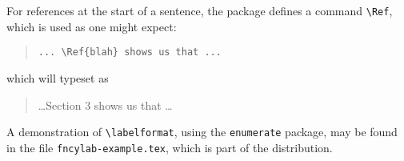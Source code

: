 \documentclass[a4paper]{article}
\newcommand\Package[1]{\texttt{#1}}
\newcommand\cs[1]{\texttt{\textbackslash#1}}
\begin{document}
For references at the start of a sentence, the package defines a
command \cs{Ref}, which is used as one might expect:
\begin{quote}
\begin{verbatim}
... \Ref{blah} shows us that ...
\end{verbatim}
\end{quote}
which will typeset as
\begin{quote}
  \dots\@ Section 3 shows us that \dots
\end{quote}

A demonstration of \cs{labelformat}, using the \Package{enumerate}
package, may be found in the file \texttt{fncylab-example.tex}, which
is part of the distribution.
\end{document}
